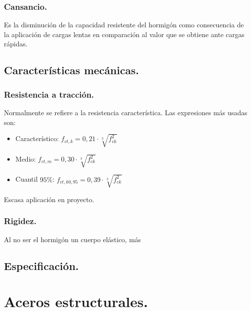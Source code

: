 \subsubsection{Cansancio.}
Es la disminución de la capacidad resistente del hormigón como consecuencia de la aplicación de cargas lentas en comparación al valor que se obtiene ante cargas rápidas.

\subsection{Características mecánicas.}



\subsubsection{Resistencia a tracción.}
Normalmente se refiere a la resistencia característica. Las expresiones más usadas son:
\begin{itemize}
    \item Característico: $f_{ct, k} = 0,21 \cdot \sqrt[3]{f_{ck}^2}$
    \item Medio: $f_{ct, m} = 0,30 \cdot \sqrt[3]{f_{ck}^2}$
    \item Cuantil $95\%$: $f_{ct, k 0,95} = 0,39 \cdot \sqrt[3]{f_{ck}^2}$
\end{itemize}
Escasa aplicación en proyecto.

\subsubsection{Rigidez.}
Al no ser el hormigón un cuerpo  elástico, más 

\subsection{Especificación.}

\section{Aceros estructurales.}
